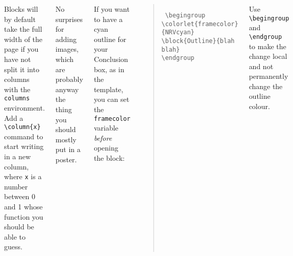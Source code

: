 \documentclass{NRVposter}
\begin{document}
\begin{columns}
{Blocks will by default take the full width of the page if you have not split it 
into columns with the \texttt{columns} environment.
Add a \texttt{\textbackslash column\{x\}} command to start writing in a new 
column, where \texttt{x} is a number between 0 and 1 whose function you should 
be able to guess.

No surprises for adding images, which are probably anyway the thing you should 
mostly put in a poster.
}

\begingroup
{}
{If you want to have a cyan outline for your Conclusion box, as in the 
template, you can set the \texttt{framecolor} variable \emph{before} opening 
the block:
\begin{quote}\texttt{\noindent
\textbackslash begingroup\\
\textbackslash colorlet\{framecolor\}\{NRVcyan\}\\
\textbackslash block\{Outline\}\{blah blah\}\\
\textbackslash endgroup
}\end{quote}
Use \texttt{\textbackslash begingroup} and \texttt{\textbackslash endgroup} to 
make the change local and not permanently change the outline colour.
}
\endgroup


\end{columns}
\end{document}
